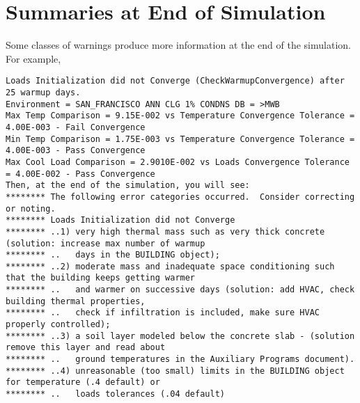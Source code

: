 \section{Summaries at End of Simulation}\label{summaries-at-end-of-simulation}

Some classes of warnings produce more information at the end of the simulation. For example,

\begin{lstlisting}
Loads Initialization did not Converge (CheckWarmupConvergence) after 25 warmup days.
Environment = SAN_FRANCISCO ANN CLG 1% CONDNS DB = >MWB
Max Temp Comparison = 9.15E-002 vs Temperature Convergence Tolerance = 4.00E-003 - Fail Convergence
Min Temp Comparison = 1.75E-003 vs Temperature Convergence Tolerance = 4.00E-003 - Pass Convergence
Max Cool Load Comparison = 2.9010E-002 vs Loads Convergence Tolerance = 4.00E-002 - Pass Convergence
Then, at the end of the simulation, you will see:
******** The following error categories occurred.  Consider correcting or noting.
******** Loads Initialization did not Converge
******** ..1) very high thermal mass such as very thick concrete (solution: increase max number of warmup
******** ..   days in the BUILDING object);
******** ..2) moderate mass and inadequate space conditioning such that the building keeps getting warmer
******** ..   and warmer on successive days (solution: add HVAC, check building thermal properties,
******** ..   check if infiltration is included, make sure HVAC properly controlled);
******** ..3) a soil layer modeled below the concrete slab - (solution remove this layer and read about
******** ..   ground temperatures in the Auxiliary Programs document).
******** ..4) unreasonable (too small) limits in the BUILDING object for temperature (.4 default) or
******** ..   loads tolerances (.04 default)
\end{lstlisting}
